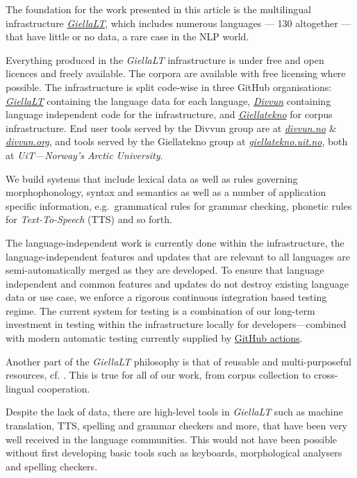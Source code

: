 \documentclass[free]{flammie}
\begin{document}
The foundation for the work presented in this article is the multilingual
infrastructure \textit{\href{https://github.com/giellalt}{GiellaLT}}, which
includes numerous languages --- 130 altogether --- that have little or no data,
a rare case in the NLP world.

Everything produced in the \textit{GiellaLT} infrastructure is under free and
open licences and freely available.  The corpora are available with free
licensing where possible.  The infrastructure is split code-wise in three GitHub
organisations: \textit{\href{https://github.com/giellalt}{GiellaLT}} containing
the language data for each language,
\textit{\href{https://github.com/divvun}{Divvun}} containing language
independent code for the infrastructure, and
\textit{\href{https://github.com/giellatekno}{Giellatekno}} for corpus
infrastructure.  End user tools served by the Divvun group are at
\textit{\href{https://divvun.no}{divvun.no}} \&
\textit{\href{https://divvun.org}{divvun.org}}, and tools served by the
Giellatekno group at
\textit{\href{https://giellatekno.uit.no}{giellatekno.uit.no}}, both at
\textit{UiT---Norway's Arctic University}.

We build systems that include lexical data as well as rules governing
morphophonology, syntax and semantics as well as a number of application
specific information, e.g.\ grammatical rules for grammar checking, phonetic
rules for \textit{Text-To-Speech} (TTS) and so forth.

The language-independent work is currently done within the infrastructure, the
language-independent features and updates that are relevant to all languages are
semi-automatically merged as they are developed.  To ensure that language
independent and common features and updates do not destroy existing language
data or use case, we enforce a rigorous continuous integration based testing
regime.  The current system for testing is a combination of our long-term
investment in testing within the infrastructure locally for
developers---combined with modern automatic testing currently supplied by
\href{https://github.com/divvun/actions}{GitHub actions}.

Another part of the \textit{GiellaLT} philosophy is that of reusable and
multi-purposeful resources, cf. \cite{antonsen2010reusing}. This is
true for all of our work, from corpus collection to cross-lingual cooperation.

Despite the lack of data, there are high-level tools in \textit{GiellaLT} such
as machine translation, TTS, spelling and grammar checkers and more, that have
been very well received in the language communities. This would not have been
possible without first developing basic tools such as keyboards, morphological
analysers and spelling checkers.
\end{document}

